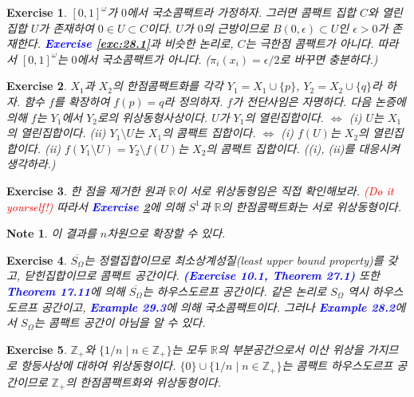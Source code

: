 \documentclass{article}
\newtheorem{exercise}{Exercise}[section]
\newtheorem*{note}{Note}
\newcommand{\R}{\mathbb{R}}
\newcommand{\Z}{\mathbb{Z}}
\begin{document}
\begin{exercise}
    $[0,1]^\omega$가 $0$에서 국소콤팩트라 가정하자. 그러면 콤팩트 집합 $C$와 열린집합 $U$가 존재하여 $0\in U\subset C$이다. $U$가 $0$의 근방이므로 $B(0,\epsilon)\subset U$인 $\epsilon>0$가 존재한다. \textcolor{blue}{\textbf{Exercise \ref{exc:28.1}}}과 비슷한 논리로, $C$는 극한점 콤팩트가 아니다. 따라서 $[0,1]^\omega$는 $0$에서 국소콤팩트가 아니다. ($\pi_i(x_i)=\epsilon/2$로 바꾸면 충분하다.)
\end{exercise}

\begin{exercise}
	\label{exc:29.5}
    $X_1$과 $X_2$의 한점콤팩트화를 각각 $Y_1=X_1\cup\{p\}$, $Y_2=X_2\cup\{q\}$라 하자. 함수 $f$를 확장하여 $f(p)=q$라 정의하자. $f$가 전단사임은 자명하다. 다음 논증에 의해 $f$는 $Y_1$에서 $Y_2$로의 위상동형사상이다. $U$가 $Y_1$의 열린집합이다. $\Longleftrightarrow$ (i) $U$는 $X_1$의 열린집합이다. (ii) $Y_1\setminus U$는 $X_1$의 콤팩트 집합이다. $\Longleftrightarrow$ (i) $f(U)$는 $X_2$의 열린집합이다. (ii) $f(Y_1\setminus U)=Y_2\setminus f(U)$는 $X_2$의 콤팩트 집합이다. ((i), (ii)를 대응시켜 생각하라.)
\end{exercise}

\begin{exercise}
    한 점을 제거한 원과 $\R$이 서로 위상동형임은 직접 확인해보라. \textcolor{red}{(Do it yourself!)} 따라서 \textcolor{blue}{\textbf{Exercise \ref{exc:29.5}}}에 의해 $S^1$과 $\R$의 한점콤팩트화는 서로 위상동형이다.
\end{exercise}
\begin{note}
    이 결과를 $n$차원으로 확장할 수 있다.
\end{note}

\begin{exercise}
    $\overline{S_\Omega}$는 정렬집합이므로 최소상계성질(least upper bound property)를 갖고, 닫힌집합이므로 콤팩트 공간이다. \textcolor{blue}{\textbf{(Exercise 10.1, Theorem 27.1)}} 또한 \textcolor{blue}{\textbf{Theorem 17.11}}에 의해 $\overline{S_\Omega}$는 하우스도르프 공간이다. 같은 논리로 $S_\Omega$ 역시 하우스도르프 공간이고, \textcolor{blue}{\textbf{Example 29.3}}에 의해 국소콤팩트이다. 그러나 \textcolor{blue}{\textbf{Example 28.2}}에서 $S_\Omega$는 콤팩트 공간이 아님을 알 수 있다.
\end{exercise}

\begin{exercise}
    $\Z_+$와 $\{1/n\mid n\in\Z_+\}$는 모두 $\R$의 부분공간으로서 이산 위상을 가지므로 항등사상에 대하여 위상동형이다. $\{0\}\cup\{1/n\mid n\in\Z_+\}$는 콤팩트 하우스도르프 공간이므로 $\Z_+$의 한점콤팩트화와 위상동형이다.
\end{exercise}
\end{document}
